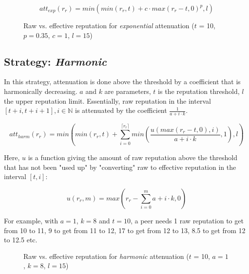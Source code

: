 \[att_{exp}(r_r) = min(min(r_r, t) + c \cdot max(r_r - t, 0)^p, l)\]

\begin{figure}[t]
\centering
{}
\caption{Raw vs. effective reputation for \emph{exponential} attenuation ($t$ =
10, $p = 0.35$, $c = 1$, $l = 15$)}
\label{fig:att_exp_raw_vs_eff}
\end{figure}

\subsection{Strategy: \emph{Harmonic}}
In this strategy, attenuation is done above the threshold by a coefficient that
is harmonically decreasing. $a$ and $k$ are parameters, $t$ is the reputation
threshold, $l$ the upper reputation limit. Essentially, raw reputation in the
interval $[t + i, t + i + 1], i \in \mathbb{N}$ is attenuated by the coefficient
$\frac{1}{a + i \cdot k}$.

\[att_{harm}(r_r) = min(min(r_r, t) + \sum_{i=0}^{\lceil r_r
\rceil}{min(\frac{u(max(r_r - t, 0), i)}{a + i \cdot k}, 1)}, l)\]

Here, $u$ is a function giving the amount of raw reputation above the threshold
that has not been "used up" by "converting" raw to effective reputation in the
interval $[t, i]$:

\[u(r_r, m) = max(r_r - \sum_{i=0}^m{a + i \cdot k}, 0)\]

For example, with $a = 1$, $k = 8$ and $t = 10$, a peer needs 1 raw reputation
to get from 10 to 11, 9 to get from 11 to 12, 17 to get from 12 to 13, 8.5 to
get from 12 to 12.5 etc.

\begin{figure}[t]
\centering
{}
\caption{Raw vs. effective reputation for \emph{harmonic} attenuation ($t$ = 10,
$a = 1$, $k = 8$, $l = 15$)}
\label{fig:att_harm_raw_vs_eff}
\end{figure}

